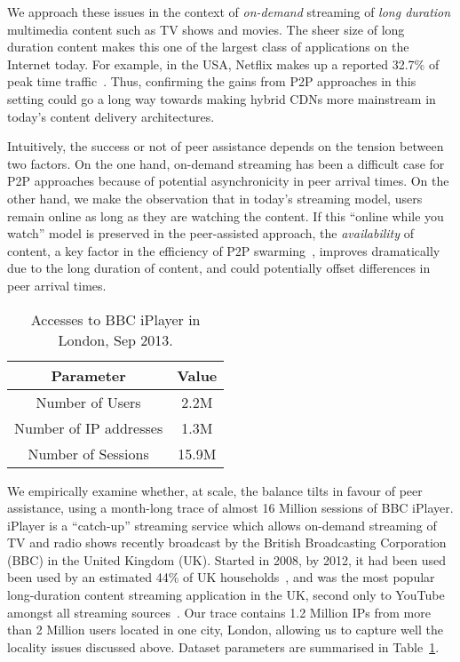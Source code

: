 \documentclass[10pt, conference, letterpaper]{IEEEtran}
\newcommand\tref[1]{Table~\ref{#1}}
\begin{document}
We approach these issues in the context of \emph{on-demand} streaming of \emph{long duration} multimedia content such as TV shows and movies. The sheer size of long duration content makes this one of the largest class of applications on the Internet today. For example, in the USA, Netflix makes up a reported 32.7\% of peak time traffic~\cite{sandvine}. Thus, confirming the gains from P2P approaches in this setting could go a long way towards making hybrid CDNs more mainstream in today's content delivery architectures. 

Intuitively, the success or not of peer assistance depends on the tension between two factors. On the one hand, on-demand streaming has been a difficult case for P2P approaches because of  potential asynchronicity in peer arrival times. On the other hand, we make the observation that in today's streaming model, users remain online as long as they are watching the content. If this ``online while you watch'' model is preserved in the peer-assisted approach, the \emph{availability} of content, a key factor in the efficiency of P2P swarming~\cite{menasche2013content,kaune2010unraveling}, improves dramatically due to the long duration of content, and could potentially offset differences in peer arrival times.

\begin{table}
\small{
\centering
\begin{tabular}{c|c}
Parameter & Value \\
\hline
\hline
Number of Users & 2.2M \\
Number of IP addresses & 1.3M \\
Number of Sessions & 15.9M \\
\hline
\end{tabular}
\caption{Accesses to BBC iPlayer in London, Sep 2013.}\vspace{-6mm}
\label{tbl:dataset}}
\end{table}

We empirically examine whether, at scale, the balance tilts in favour of peer assistance, using a month-long trace of almost 16 Million sessions of BBC iPlayer. iPlayer is a ``catch-up'' streaming service which allows on-demand streaming of TV and radio shows recently broadcast by the British Broadcasting Corporation (BBC) in the United Kingdom (UK). Started in 2008, by 2012, it had been used been used by an estimated 44\% of UK households~\cite{ofcom}, and was the most popular long-duration content streaming application in the UK, second only to YouTube amongst all streaming sources~\cite{sandvine}. Our trace contains 1.2 Million IPs from more than 2 Million users located in one city, London, allowing us to capture well the locality issues discussed above. Dataset parameters are summarised in \tref{tbl:dataset}. 
\end{document}
